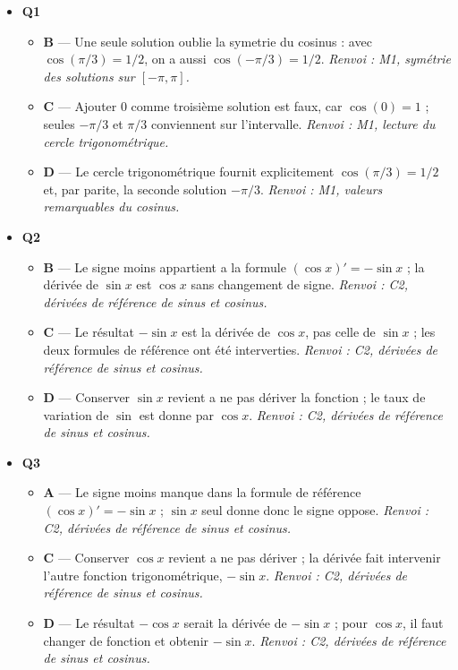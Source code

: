 \begin{itemize}
  \item \textbf{Q1}
  \begin{itemize}
    \item \textbf{B} — Une seule solution oublie la symetrie du cosinus : avec $\cos(\pi/3)=1/2$, on a aussi $\cos(-\pi/3)=1/2$. \emph{Renvoi : M1, symétrie des solutions sur $[-\pi,\pi]$.}
    \item \textbf{C} — Ajouter $0$ comme troisième solution est faux, car $\cos(0)=1$ ; seules $-\pi/3$ et $\pi/3$ conviennent sur l'intervalle. \emph{Renvoi : M1, lecture du cercle trigonométrique.}
    \item \textbf{D} — Le cercle trigonométrique fournit explicitement $\cos(\pi/3)=1/2$ et, par parite, la seconde solution $-\pi/3$. \emph{Renvoi : M1, valeurs remarquables du cosinus.}
  \end{itemize}
  \item \textbf{Q2}
  \begin{itemize}
    \item \textbf{B} — Le signe moins appartient a la formule $(\cos x)'=-\sin x$ ; la dérivée de $\sin x$ est $\cos x$ sans changement de signe. \emph{Renvoi : C2, dérivées de référence de sinus et cosinus.}
    \item \textbf{C} — Le résultat $-\sin x$ est la dérivée de $\cos x$, pas celle de $\sin x$ ; les deux formules de référence ont été interverties. \emph{Renvoi : C2, dérivées de référence de sinus et cosinus.}
    \item \textbf{D} — Conserver $\sin x$ revient a ne pas dériver la fonction ; le taux de variation de $\sin$ est donne par $\cos x$. \emph{Renvoi : C2, dérivées de référence de sinus et cosinus.}
  \end{itemize}
  \item \textbf{Q3}
  \begin{itemize}
    \item \textbf{A} — Le signe moins manque dans la formule de référence $(\cos x)'=-\sin x$ ; $\sin x$ seul donne donc le signe oppose. \emph{Renvoi : C2, dérivées de référence de sinus et cosinus.}
    \item \textbf{C} — Conserver $\cos x$ revient a ne pas dériver ; la dérivée fait intervenir l'autre fonction trigonométrique, $-\sin x$. \emph{Renvoi : C2, dérivées de référence de sinus et cosinus.}
    \item \textbf{D} — Le résultat $-\cos x$ serait la dérivée de $-\sin x$ ; pour $\cos x$, il faut changer de fonction et obtenir $-\sin x$. \emph{Renvoi : C2, dérivées de référence de sinus et cosinus.}

\end{itemize}
\end{itemize}
